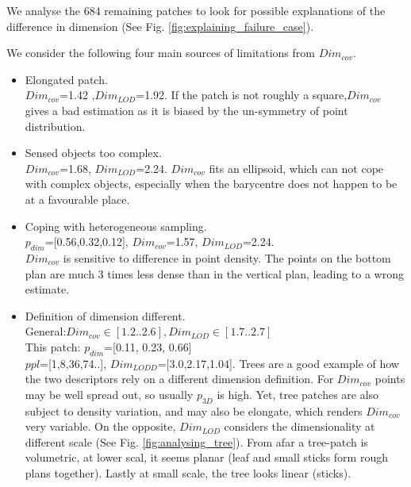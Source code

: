 		
		
		We analyse the 684 remaining patches to look for possible explanations of the difference in dimension (See Fig. \ref{fig:explaining_failure_case}).
		
		We consider the following four main sources of limitations from $Dim_{cov}$.
		\begin{itemize}%
			\item Elongated patch.\\
				$Dim_{cov}$=1.42
				,$Dim_{LOD}$=1.92. 
				If the patch is not roughly a square,$Dim_{cov}$ gives a bad estimation as it is biased by the un-symmetry of point distribution.
			\item Sensed objects too complex.\\
				$Dim_{cov}$=1.68,
				$Dim_{LOD}$=2.24.
				$Dim_{cov}$ fits an ellipsoid, which can not cope with complex objects, especially when the barycentre does not happen to be at a favourable place. 
			\item Coping with heterogeneous sampling.\\
				$p_{dim}$=[0.56,0.32,0.12],
				$Dim_{cov}$=1.57,
				$Dim_{LOD}$=2.24.\\
				$Dim_{cov}$ is sensitive to difference in point density. The points on the bottom plan are much 3 times less dense than in the vertical plan, leading to a wrong estimate.
			\item Definition of dimension different.\\
				General:$Dim_{cov}\in[1.2..2.6],Dim_{LOD}\in[1.7..2.7]$\\
				This patch: $p_{dim}$=[0.11, 0.23, 0.66]\\
				$ppl$=[1,8,36,74..],
				$Dim_{LODD}$=[3.0,2.17,1.04].
				Trees are a good example of how the two descriptors rely on a different dimension definition. For $Dim_{cov}$ points may be well spread out, so usually $p_{3D}$ is high.
				Yet, tree patches are also subject to density variation, and may also be elongate, which renders $Dim_{cov}$ very variable.
				On the opposite, $Dim_{LOD}$ considers the dimensionality at different scale (See Fig. \ref{fig:analysing_tree}). From afar a tree-patch is volumetric, at lower scal, it seems planar (leaf and small sticks form rough plans together). Lastly at small scale, the tree looks linear (sticks). 
		\end{itemize}
		 

